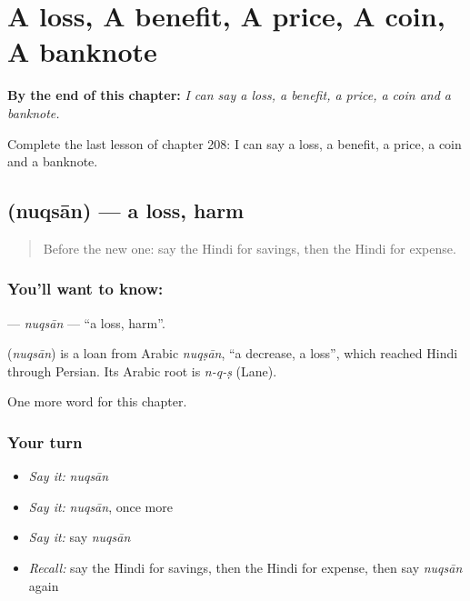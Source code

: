 
\chapter{A loss, A benefit, A price, A coin, A banknote}
\label{ch:hi-a-loss-a-benefit-a-price-a-coin-a-banknote}

\begin{chapteropening}
\textbf{By the end of this chapter:} \emph{I can say a loss, a benefit, a price, a coin and a banknote.}

Complete the last lesson of chapter 208: I can say a loss, a benefit, a price, a coin and a banknote.
\end{chapteropening}

\section[\texorpdfstring{\hi{नुक़सान} (nuqsān)}{नुक़सान (nuqsān)}]{ (nuqsān) — a loss, harm}

\label{lesson:HI-C208-nuqsan}



\begin{quote}
Before the new one: say the Hindi for savings, then the Hindi for expense.
\end{quote}

\subsection*{You'll want to know: }
\textbf{} — \emph{nuqsān} — \textquotedblleft{}a loss, harm\textquotedblright{}.

\begin{cousinweb}
\textbf{} (\emph{nuqsān}) is a loan from Arabic \emph{nuqṣān}, \textquotedblleft{}a decrease, a loss\textquotedblright{}, which reached Hindi through Persian. Its Arabic root is \emph{n-q-ṣ} (Lane).
\end{cousinweb}

\begin{grammarlens}[title={What you've built}]
One more word for this chapter.
\end{grammarlens}

\subsection*{Your turn}
\begin{itemize}
\raggedright
  \item \emph{Say it:} \emph{nuqsān}
  \item \emph{Say it:} \emph{nuqsān}, once more
  \item \emph{Say it:} say \emph{nuqsān}
  \item \emph{Recall:} say the Hindi for savings, then the Hindi for expense, then say \emph{nuqsān} again
\end{itemize}

